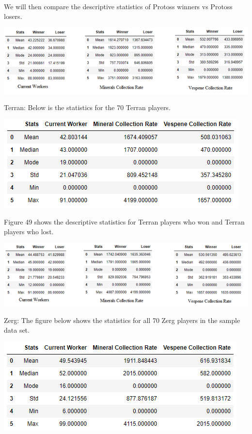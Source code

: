 \documentclass[a4paper,12pt]{report}
\begin{document}
We will then compare the descriptive statistics of Protoss winners vs Protoss losers. 

\begin{center}
    \captionsetup{type=figure}
    \includegraphics[width=.9\linewidth]{media/ProtossWinnervsLoser.png}
\end{center}

Terran:
Below is the statistics for the 70 Terran players.

\begin{center}
    \captionsetup{type=figure}
    \includegraphics[width=.9\linewidth]{media/TerranDescriptive.png}
\end{center}

Figure 49 shows the descriptive statistics for Terran players who won and Terran players who lost. 

\begin{center}
    \captionsetup{type=figure}
    \includegraphics[width=.9\linewidth]{media/TerranWinnervsLoser.png}
\end{center}

Zerg:
The figure below shows the statistics for all 70 Zerg players in the sample data set. 

\begin{center}
    \captionsetup{type=figure}
    \includegraphics[width=.9\linewidth]{media/ZergDescriptive.png}
\end{center}
\end{document}
